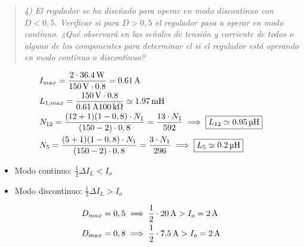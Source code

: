 \begin{quote} \textit{ 4) El regulador se ha diseñado para operar en modo discontinuo con $D<0,5$. Verificar si para $D>0,5$ el regulador pasa a operar en modo continuo. ¿Qué observará en las señales de tensión y corriente de todos o alguno de los componentes para determinar el si el regulador está operando en modo continuo o discontinuo?}
\end{quote}

\begin{align*}
	\centering
	& I_{max} = \frac{ 2 \cdot \SI{36.4}{\watt} }{\SI{150}{\volt} \cdot \num{0,8}} = \SI{0.61}{\ampere} \\
	& L_{1,max} = \frac{\SI{150}{\volt} \cdot \num{0,8}}{\SI{0.61}{\ampere} \SI{100}{\kilo\ohm}} \simeq \SI{1.97}{\milli\henry} \\
	& N_{12} = \frac{ (12+1)(1-0,8) \cdot N_1}{ (150-2) \cdot 0,8} = \frac{13 \cdot N_1}{592} \implies \boxed{L_{12} \simeq \SI{0.95}{\micro\henry}} \\
	& N_5 = \frac{(5+1)(1-0,8) \cdot N_1}{(150-2) \cdot 0,8} = \frac{3 \cdot N_1}{296} \implies \boxed{L_5 \simeq \SI{0.2}{\micro\henry}}
\end{align*}


\begin{itemize}
	\item Modo continuo:\hspace{0.4cm} $ \frac{1}{2} \Delta I_L < I_o $
	\item Modo discontinuo: $ \frac{1}{2} \Delta I_L > I_o $
\end{itemize}


\begin{align*}
	\centering
	D_{max} &= 0,5 \implies \frac{1}{2} \cdot \SI{20}{\ampere} > I_o = \SI{2}{\ampere} \\
	D_{max} &= 0,8 \implies \frac{1}{2} \cdot \SI{7.5}{\ampere} > I_o = \SI{2}{\ampere}
\end{align*}
